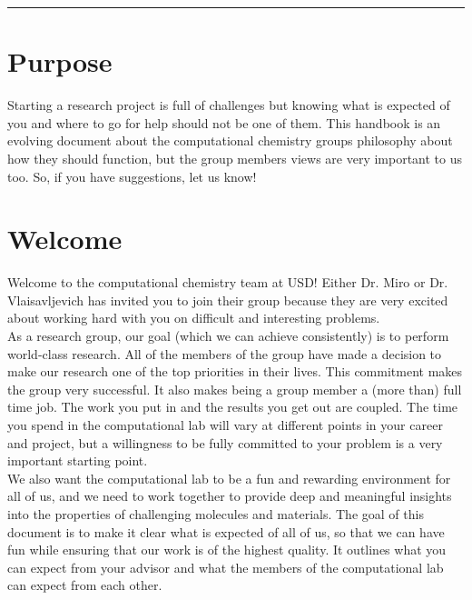 \documentclass[letterpaper]{article}
\begin{document}

\noindent\rule{16.5cm}{1.5pt}


\section{Purpose}
Starting a research project is full of challenges but knowing what is expected of you and where to go for help should not be one of them. This handbook is an evolving document about the computational chemistry groups philosophy about how they should function, but the group members views are very important to us too. So, if you have suggestions, let us know!

\section{Welcome}
Welcome to the computational chemistry team at USD!  Either Dr. Miro or Dr. Vlaisavljevich has invited you to join their group because they are very excited about working hard with you on difficult and interesting problems.\\

As a research group, our goal (which we can achieve consistently) is to perform world-class research. All of the members of the group have made a decision to make our research one of the top priorities in their lives. This commitment makes the group very successful. It also makes being a group member a (more than) full time job. The work you put in and the results you get out are coupled. The time you spend in the computational lab will vary at different points in your career and project, but a willingness to be fully committed to your problem is a very important starting point.\\

We also want the computational lab to be a fun and rewarding environment for all of us, and we need to work together to provide deep and meaningful insights into the properties of challenging molecules and materials. The goal of this document is to make it clear what is expected of all of us, so that we can have fun while ensuring that our work is of the highest quality. It outlines what you can expect from your advisor and what the members of the computational lab can expect from each other.\\
\end{document}
